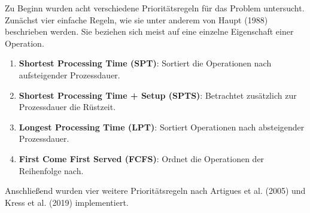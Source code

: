 Zu Beginn wurden acht verschiedene Prioritätsregeln für das Problem untersucht.
Zunächst vier einfache Regeln, wie sie unter anderem von Haupt (1988) \cite{haupt_heuristic_1988} beschrieben werden.
Sie beziehen sich meist auf eine einzelne Eigenschaft einer Operation.

\begin{enumerate}
    \item \textbf{Shortest Processing Time (SPT)}: Sortiert die Operationen nach aufsteigender Prozessdauer.
    \item \textbf{Shortest Processing Time + Setup (SPTS)}: Betrachtet zusätzlich zur Prozessdauer die Rüstzeit.
    \item \textbf{Longest Processing Time (LPT)}: Sortiert Operationen nach absteigender Prozessdauer.
    \item \textbf{First Come First Served (FCFS)}: Ordnet die Operationen der Reihenfolge nach.\\
\end{enumerate}

Anschließend wurden vier weitere Prioritätsregeln nach Artigues et al. (2005) \cite{artigues_schedule_2005} und Kress et al. (2019) \cite{kress_worker_2019} implementiert.

